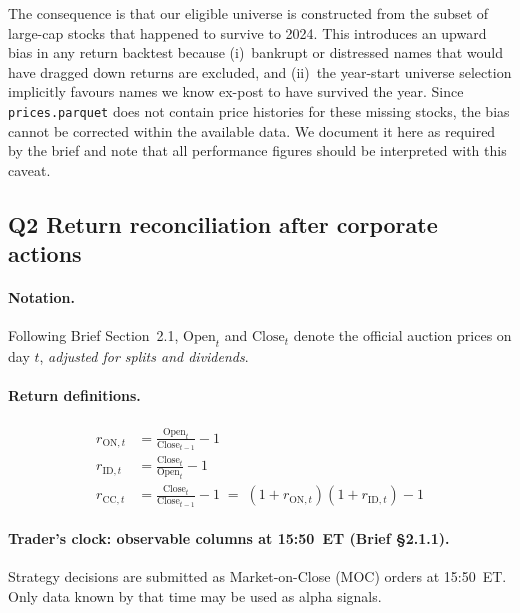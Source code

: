 \documentclass[12pt,a4paper]{article}
\begin{document}
The consequence is that our eligible universe is constructed from the subset
of large-cap stocks that happened to survive to 2024.
This introduces an upward bias in any return backtest because
(i)~bankrupt or distressed names that would have dragged down returns are
excluded, and (ii)~the year-start universe selection implicitly favours names
we know ex-post to have survived the year.
Since \texttt{prices.parquet} does not contain price histories for these
missing stocks, the bias cannot be corrected within the available data.
We document it here as required by the brief and note that all performance
figures should be interpreted with this caveat.

\subsection*{Q2 \quad Return reconciliation after corporate actions}
\label{sec:q2}

\paragraph{Notation.}
Following Brief Section~2.1, $\text{Open}_t$ and $\text{Close}_t$ denote the
official auction prices on day $t$, \emph{adjusted for splits and dividends}.

\paragraph{Return definitions.}
\begin{align}
r_{\text{ON},t} &= \frac{\text{Open}_t}{\text{Close}_{t-1}} - 1
  \label{eq:ron}\\[4pt]
r_{\text{ID},t} &= \frac{\text{Close}_t}{\text{Open}_t} - 1
  \label{eq:rid}\\[4pt]
r_{\text{CC},t} &= \frac{\text{Close}_t}{\text{Close}_{t-1}} - 1
  \;=\; (1 + r_{\text{ON},t})(1 + r_{\text{ID},t}) - 1
  \label{eq:rcc}
\end{align}

\paragraph{Trader's clock: observable columns at 15:50~ET (Brief §2.1.1).}
Strategy decisions are submitted as Market-on-Close (MOC) orders at 15:50~ET.
Only data known by that time may be used as alpha signals.
\end{document}
